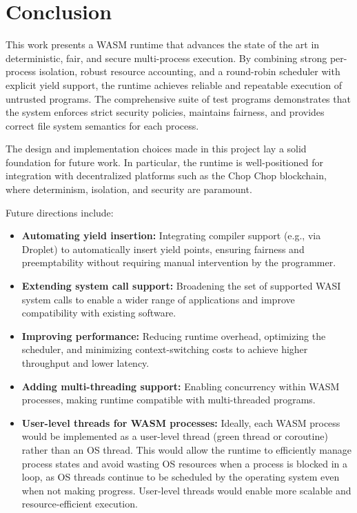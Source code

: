 \documentclass[10pt,a4paper,twocolumn]{IEEEtran}
\begin{document}
\section{Conclusion}\label{sec:conclusion}

This work presents a WASM runtime that advances the state of the art in deterministic, fair, and secure multi-process execution. By combining strong per-process isolation, robust resource accounting, and a round-robin scheduler with explicit yield support, the runtime achieves reliable and repeatable execution of untrusted programs. The comprehensive suite of test programs demonstrates that the system enforces strict security policies, maintains fairness, and provides correct file system semantics for each process.

The design and implementation choices made in this project lay a solid foundation for future work. In particular, the runtime is well-positioned for integration with decentralized platforms such as the Chop Chop blockchain, where determinism, isolation, and security are paramount. 

Future directions include:
\begin{itemize}
    \item \textbf{Automating yield insertion:} Integrating compiler support (e.g., via Droplet) to automatically insert yield points, ensuring fairness and preemptability without requiring manual intervention by the programmer.
    \item \textbf{Extending system call support:} Broadening the set of supported WASI system calls to enable a wider range of applications and improve compatibility with existing software.
    \item \textbf{Improving performance:} Reducing runtime overhead, optimizing the scheduler, and minimizing context-switching costs to achieve higher throughput and lower latency.
    \item \textbf{Adding multi-threading support:} Enabling concurrency within WASM processes, making runtime compatible with multi-threaded programs.
    \item \textbf{User-level threads for WASM processes:} Ideally, each WASM process would be implemented as a user-level thread (green thread or coroutine) rather than an OS thread. This would allow the runtime to efficiently manage process states and avoid wasting OS resources when a process is blocked in a loop, as OS threads continue to be scheduled by the operating system even when not making progress. User-level threads would enable more scalable and resource-efficient execution.
\end{itemize}
\end{document}
